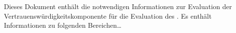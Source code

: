 
Dieses Dokument enthält die notwendigen Informationen zur Evaluation der
Vertrauenswürdigkeitskomponente  für die Evaluation des
\thisproductlong{}. Es enthält Informationen zu folgenden Bereichen\dots

